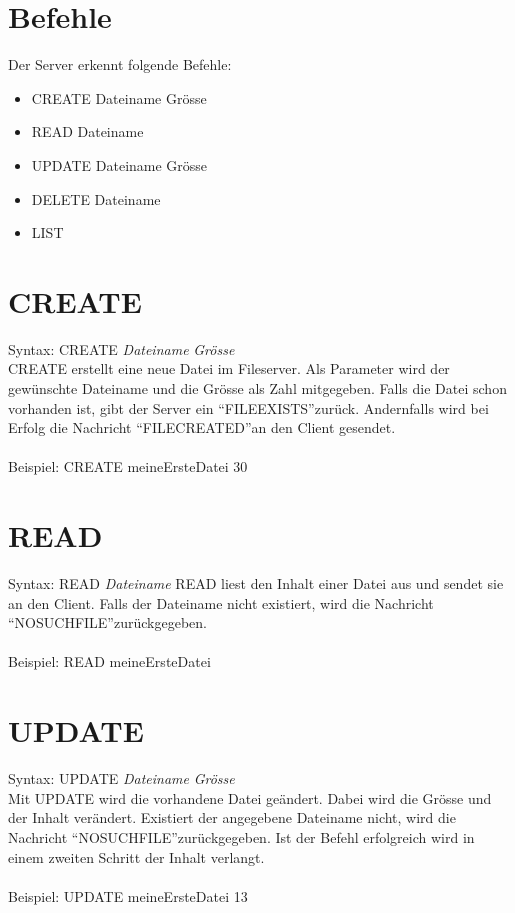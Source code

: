 \documentclass[12pt,a4paper,ngerman]{report}
\begin{document}
\section{Befehle}
Der Server erkennt folgende Befehle:
\begin{itemize}
	\item CREATE Dateiname Grösse
	\item READ Dateiname
	\item UPDATE Dateiname Grösse
	\item DELETE Dateiname
	\item LIST
\end{itemize}

\section{CREATE}
Syntax: CREATE \textit{Dateiname} \textit{Grösse} \\
CREATE erstellt eine neue Datei im Fileserver. Als Parameter wird der gewünschte Dateiname und die Grösse als Zahl mitgegeben. Falls die Datei schon vorhanden ist, gibt der Server ein \textquotedblleft FILEEXISTS\textquotedblright zurück. Andernfalls wird bei Erfolg die Nachricht \textquotedblleft FILECREATED\textquotedblright an den Client gesendet.\\
\\
Beispiel: CREATE meineErsteDatei 30
\section{READ}
Syntax: READ \textit{Dateiname}
READ liest den Inhalt einer Datei aus und sendet sie an den Client. Falls der Dateiname nicht existiert, wird die Nachricht \textquotedblleft NOSUCHFILE\textquotedblright zurückgegeben.\\
\\
Beispiel: READ meineErsteDatei
\section{UPDATE}
Syntax: UPDATE \textit{Dateiname} \textit{Grösse}\\
Mit UPDATE wird die vorhandene Datei geändert. Dabei wird die Grösse und der Inhalt verändert. Existiert der angegebene Dateiname nicht, wird die Nachricht \textquotedblleft NOSUCHFILE\textquotedblright zurückgegeben. Ist der Befehl erfolgreich wird in einem zweiten Schritt der Inhalt verlangt.\\
\\
Beispiel: UPDATE meineErsteDatei 13
\end{document}
